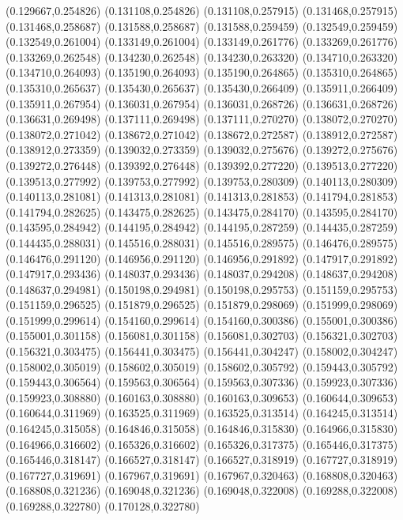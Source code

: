 (0.129667,0.254826)
(0.131108,0.254826)
(0.131108,0.257915)
(0.131468,0.257915)
(0.131468,0.258687)
(0.131588,0.258687)
(0.131588,0.259459)
(0.132549,0.259459)
(0.132549,0.261004)
(0.133149,0.261004)
(0.133149,0.261776)
(0.133269,0.261776)
(0.133269,0.262548)
(0.134230,0.262548)
(0.134230,0.263320)
(0.134710,0.263320)
(0.134710,0.264093)
(0.135190,0.264093)
(0.135190,0.264865)
(0.135310,0.264865)
(0.135310,0.265637)
(0.135430,0.265637)
(0.135430,0.266409)
(0.135911,0.266409)
(0.135911,0.267954)
(0.136031,0.267954)
(0.136031,0.268726)
(0.136631,0.268726)
(0.136631,0.269498)
(0.137111,0.269498)
(0.137111,0.270270)
(0.138072,0.270270)
(0.138072,0.271042)
(0.138672,0.271042)
(0.138672,0.272587)
(0.138912,0.272587)
(0.138912,0.273359)
(0.139032,0.273359)
(0.139032,0.275676)
(0.139272,0.275676)
(0.139272,0.276448)
(0.139392,0.276448)
(0.139392,0.277220)
(0.139513,0.277220)
(0.139513,0.277992)
(0.139753,0.277992)
(0.139753,0.280309)
(0.140113,0.280309)
(0.140113,0.281081)
(0.141313,0.281081)
(0.141313,0.281853)
(0.141794,0.281853)
(0.141794,0.282625)
(0.143475,0.282625)
(0.143475,0.284170)
(0.143595,0.284170)
(0.143595,0.284942)
(0.144195,0.284942)
(0.144195,0.287259)
(0.144435,0.287259)
(0.144435,0.288031)
(0.145516,0.288031)
(0.145516,0.289575)
(0.146476,0.289575)
(0.146476,0.291120)
(0.146956,0.291120)
(0.146956,0.291892)
(0.147917,0.291892)
(0.147917,0.293436)
(0.148037,0.293436)
(0.148037,0.294208)
(0.148637,0.294208)
(0.148637,0.294981)
(0.150198,0.294981)
(0.150198,0.295753)
(0.151159,0.295753)
(0.151159,0.296525)
(0.151879,0.296525)
(0.151879,0.298069)
(0.151999,0.298069)
(0.151999,0.299614)
(0.154160,0.299614)
(0.154160,0.300386)
(0.155001,0.300386)
(0.155001,0.301158)
(0.156081,0.301158)
(0.156081,0.302703)
(0.156321,0.302703)
(0.156321,0.303475)
(0.156441,0.303475)
(0.156441,0.304247)
(0.158002,0.304247)
(0.158002,0.305019)
(0.158602,0.305019)
(0.158602,0.305792)
(0.159443,0.305792)
(0.159443,0.306564)
(0.159563,0.306564)
(0.159563,0.307336)
(0.159923,0.307336)
(0.159923,0.308880)
(0.160163,0.308880)
(0.160163,0.309653)
(0.160644,0.309653)
(0.160644,0.311969)
(0.163525,0.311969)
(0.163525,0.313514)
(0.164245,0.313514)
(0.164245,0.315058)
(0.164846,0.315058)
(0.164846,0.315830)
(0.164966,0.315830)
(0.164966,0.316602)
(0.165326,0.316602)
(0.165326,0.317375)
(0.165446,0.317375)
(0.165446,0.318147)
(0.166527,0.318147)
(0.166527,0.318919)
(0.167727,0.318919)
(0.167727,0.319691)
(0.167967,0.319691)
(0.167967,0.320463)
(0.168808,0.320463)
(0.168808,0.321236)
(0.169048,0.321236)
(0.169048,0.322008)
(0.169288,0.322008)
(0.169288,0.322780)
(0.170128,0.322780)
